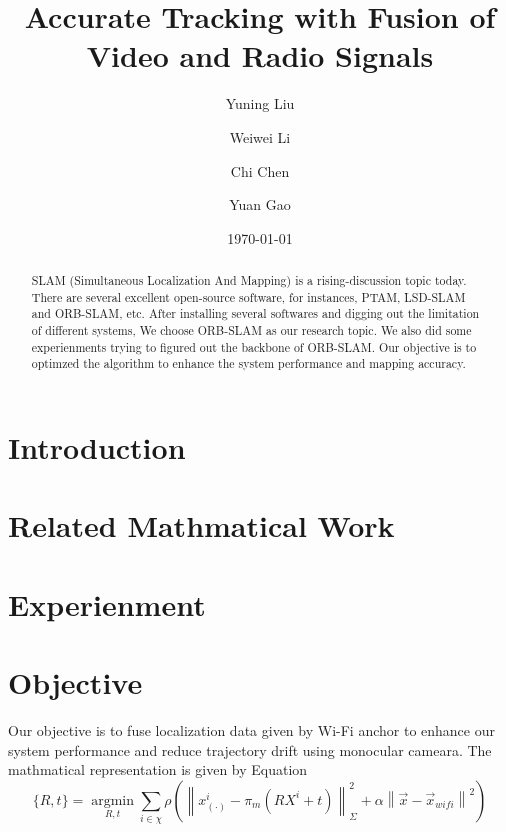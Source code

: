 \documentclass{article}
\title{Accurate Tracking with Fusion of Video and Radio Signals}
\author{Yuning Liu}
\author{Weiwei Li}
\author{Chi Chen}
\author{Yuan Gao}
\affil{University of New South Wales}
\date{\today}
\begin{document}
\maketitle
\begin{abstract}
     SLAM (Simultaneous Localization And Mapping) is a rising-discussion topic today. There are several excellent open-source software, for instances, PTAM, LSD-SLAM and ORB-SLAM, etc. After installing several softwares and digging out the limitation of different systems, We choose ORB-SLAM as our research topic. We also did some experienments trying to figured out the backbone of ORB-SLAM. Our objective is to optimzed the algorithm to enhance the system performance and mapping accuracy.
\end{abstract}

\section{Introduction}

\section{Related Mathmatical Work}


\section{Experienment}

\section{Objective}

Our objective is to fuse localization data given by Wi-Fi anchor to enhance our system performance and reduce trajectory drift using monocular cameara. The mathmatical representation is given by Equation \label{wifi math}
\begin{equation}
    \{R, t\} = \operatorname*{argmin}_{R, t} \sum_{i\in \chi} \rho(\left\|x^i_{(\cdot)}-\pi_{m}(RX^i+t)\right\|^2_\Sigma+\alpha\left\|\vec{x}-\vec{x}_{wifi}\right\|^2) \label{wifi math}
\end{equation}
\end{document}
